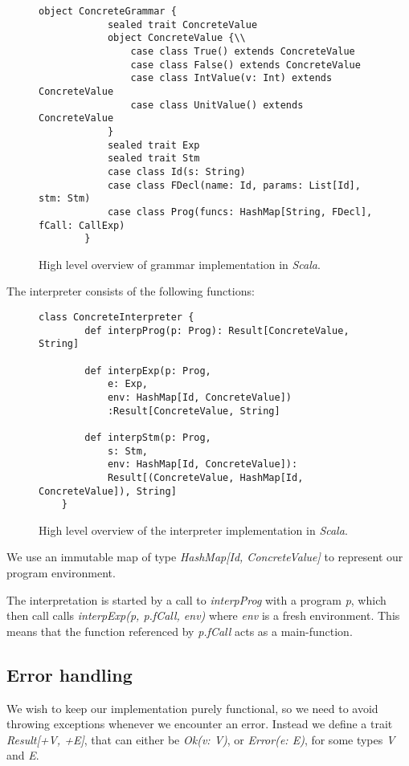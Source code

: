 \begin{figure}[!h]
	\begin{lstlisting}[style=simple]
		object ConcreteGrammar {
			sealed trait ConcreteValue
			object ConcreteValue {\\
				case class True() extends ConcreteValue
				case class False() extends ConcreteValue
				case class IntValue(v: Int) extends ConcreteValue
				case class UnitValue() extends ConcreteValue
			}
			sealed trait Exp
			sealed trait Stm
			case class Id(s: String)
			case class FDecl(name: Id, params: List[Id], stm: Stm)
			case class Prog(funcs: HashMap[String, FDecl], fCall: CallExp)	
		}
	\end{lstlisting}
	\caption{High level overview of grammar implementation in \textsl{Scala}.}
\end{figure}

The interpreter consists of the following functions:

\begin{figure}[!h]
	\begin{lstlisting}[style=simple]
	class ConcreteInterpreter {
		def interpProg(p: Prog): Result[ConcreteValue, String]
			
		def interpExp(p: Prog,
			e: Exp, 
			env: HashMap[Id, ConcreteValue])
			:Result[ConcreteValue, String]
						  
		def interpStm(p: Prog,
			s: Stm,
			env: HashMap[Id, ConcreteValue]):
			Result[(ConcreteValue, HashMap[Id, ConcreteValue]), String]
	}
	\end{lstlisting}
	\caption{High level overview of the interpreter implementation in \textsl{Scala}.}
\end{figure}
\newpage
We use an immutable map of type \textsl{HashMap[Id, ConcreteValue]} to represent our program environment.

The interpretation is started by a call to \textsl{interpProg} with a program \textsl{p}, which then call calls \textsl{interpExp(p, p.fCall, env)} where \textsl{env} is a fresh environment. This means that the function referenced by \textsl{p.fCall} acts as a main-function. 

\subsection{Error handling}
We wish to keep our implementation purely functional, so we need to avoid throwing exceptions whenever we encounter an error. Instead we define a trait \textsl{Result[+V, +E]}, that can either be \textsl{Ok(v: V)},  or \textsl{Error(e: E)}, for some types \textsl{V} and \textsl{E}.

